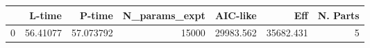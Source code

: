 \begin{tabular}{lrrrrrr}
\toprule
{} &    L-time &     P-time &  N\_params\_expt &   AIC-like &        Eff &  N. Parts \\
\midrule
0 &  56.41077 &  57.073792 &          15000 &  29983.562 &  35682.431 &         5 \\
\bottomrule
\end{tabular}

